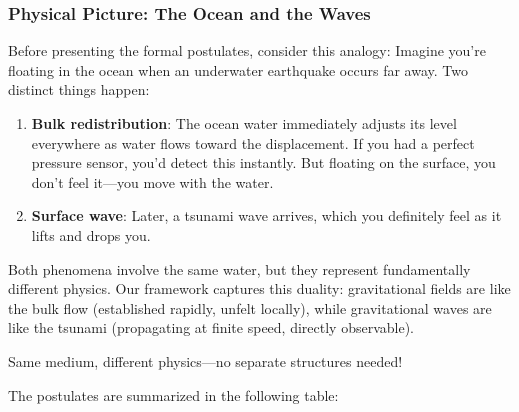 \subsubsection{Physical Picture: The Ocean and the Waves}

Before presenting the formal postulates, consider this analogy: Imagine you're floating in the ocean when an underwater earthquake occurs far away. Two distinct things happen:

\begin{enumerate}
\item \textbf{Bulk redistribution}: The ocean water immediately adjusts its level everywhere as water flows toward the displacement. If you had a perfect pressure sensor, you'd detect this instantly. But floating on the surface, you don't feel it—you move with the water.
\item \textbf{Surface wave}: Later, a tsunami wave arrives, which you definitely feel as it lifts and drops you.
\end{enumerate}

Both phenomena involve the same water, but they represent fundamentally different physics. Our framework captures this duality: gravitational fields are like the bulk flow (established rapidly, unfelt locally), while gravitational waves are like the tsunami (propagating at finite speed, directly observable).

Same medium, different physics—no separate structures needed!


The postulates are summarized in the following table:

